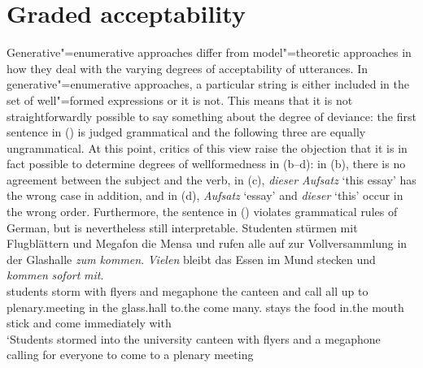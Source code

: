 \section{Graded acceptability}

Generative"=enumerative approaches differ from model"=theoretic approaches in how they deal with the varying degrees of acceptability
of utterances. In generative"=enumerative approaches, a particular string is either included in the set of well"=formed expressions or it is not.
This means that it is not straightforwardly possible to say something about the degree of deviance: the first sentence in () is judged grammatical
and the following three are equally ungrammatical.
\eal
{}
\zl
At this point, critics of this view raise the objection that it is in fact possible to determine degrees of wellformedness
in (b--d): in (b), there is no agreement between the subject and the verb, in
(c),  \emph{dieser Aufsatz} `this essay'  has the wrong case in addition, and in (d),
\emph{Aufsatz} `essay' and \emph{dieser} `this' occur in the wrong order. Furthermore,
 the sentence in () violates grammatical rules of German, but is nevertheless still interpretable.
\ea
\gll Studenten stürmen mit Flugblättern und Megafon die Mensa und rufen alle auf zur Vollversammlung in der Glashalle \emph{zum} \emph{kommen}. \emph{Vielen} bleibt das Essen im Mund stecken und \emph{kommen} \emph{sofort} \emph{mit}.\footnotemark\\
students storm with flyers and megaphone the canteen and call all up to plenary.meeting in the glass.hall to.the come many.\dat{} stays the food in.the mouth stick and come immediately with\\
\glt `Students stormed into the university canteen with flyers and a megaphone calling for everyone to come to a plenary meeting
